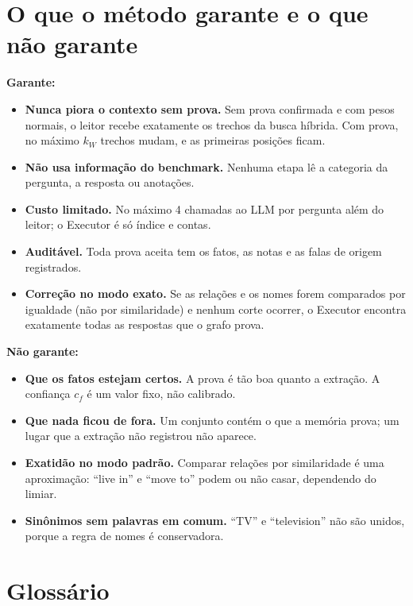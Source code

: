 \documentclass[11pt]{article}
\begin{document}
\section{O que o método garante e o que não garante}
\label{sec:garantias}

\textbf{Garante:}
\begin{itemize}
\item \textbf{Nunca piora o contexto sem prova.} Sem prova confirmada e com
  pesos normais, o leitor recebe exatamente os trechos da busca híbrida. Com
  prova, no máximo $k_W$ trechos mudam, e as primeiras posições ficam.
\item \textbf{Não usa informação do benchmark.} Nenhuma etapa lê a categoria da
  pergunta, a resposta ou anotações.
\item \textbf{Custo limitado.} No máximo 4 chamadas ao LLM por pergunta além do
  leitor; o Executor é só índice e contas.
\item \textbf{Auditável.} Toda prova aceita tem os fatos, as notas e as falas de
  origem registrados.
\item \textbf{Correção no modo exato.} Se as relações e os nomes forem
  comparados por igualdade (não por similaridade) e nenhum corte ocorrer, o
  Executor encontra exatamente todas as respostas que o grafo prova.
\end{itemize}

\textbf{Não garante:}
\begin{itemize}
\item \textbf{Que os fatos estejam certos.} A prova é tão boa quanto a
  extração. A confiança $c_f$ é um valor fixo, não calibrado.
\item \textbf{Que nada ficou de fora.} Um conjunto contém o que a memória
  prova; um lugar que a extração não registrou não aparece.
\item \textbf{Exatidão no modo padrão.} Comparar relações por similaridade é uma
  aproximação: ``live in'' e ``move to'' podem ou não casar, dependendo do
  limiar.
\item \textbf{Sinônimos sem palavras em comum.} ``TV'' e ``television'' não são
  unidos, porque a regra de nomes é conservadora.
\end{itemize}

\section{Glossário}
\label{sec:glossario}
\end{document}
